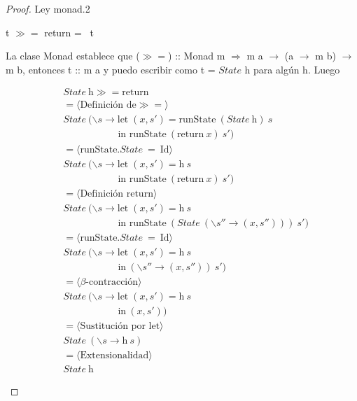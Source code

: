\documentclass[a4paper,12pt]{article}
\begin{document}
\newpage
\begin{proof}
Ley monad.2
\begin{center}
 t $\gg=$ return \; = \ t
\end{center}

La clase Monad establece que ($\gg=$) :: Monad m $\Rightarrow$ m a $\to$ (a $\to$ m b) $\to$ m b,
entonces t :: m a y  puedo escribir como t = $State$ h para algún h. Luego

\begin{fleqn}
\begin{equation} 
\begin{split}
  & State \ \mbox{h} \gg= \text{return}\\
  & =\langle \mbox{Definición de}\gg= \rangle \\
  & State \ (\backslash s \to \mbox{let} \; (x,s') = \mbox{runState} \ (State \ \mbox{h}) \ s \\
  & \hspace{67pt} \mbox{in  runState} \ (\mbox{return} \ x) \ s')\\
  & =\langle \mbox{runState}.State \ = \ \mbox{Id}  \rangle \\
  & State \ (\backslash s \to \mbox{let} \; (x,s') = \mbox{h} \ s \\
  & \hspace{67pt} \mbox{in  runState} \ (\mbox{return} \ x) \ s')\\
  & =\langle \mbox{Definición return}  \rangle \\
  & State \ (\backslash s \to \mbox{let} \; (x,s') = \mbox{h} \ s \\
  & \hspace{67pt} \mbox{in  runState} \ (State \ (\backslash s''\to (x,s''))) \ s')\\
  & =\langle \mbox{runState}.State \ = \ \mbox{Id}  \rangle \\
  & State \ (\backslash s \to \mbox{let} \; (x,s') = \mbox{h} \ s\\
  & \hspace{67pt} \mbox{in} \ (\backslash s''\to (x,s'')) \ s')\\
  & =\langle \beta \mbox{-contracción}  \rangle \\
  & State \ (\backslash s \to \mbox{let} \; (x,s') = \mbox{h} \ s\\
  & \hspace{67pt} \mbox{in} \ (x,s'))\\
  & =\langle \mbox{Sustitución por let}  \rangle \\
  & State \ (\backslash s \to  \mbox{h} \ s)\\
  & =\langle \mbox{Extensionalidad}  \rangle \\
  & State \ \mbox{h}
\end{split}
\end{equation}
\end{fleqn}
\end{proof}
\end{document}
